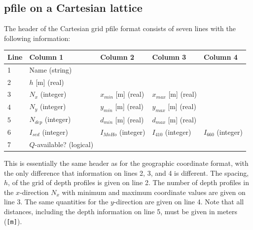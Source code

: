 \documentclass[11pt]{report}
\begin{document}
\subsection{pfile on a Cartesian lattice}
The header of the Cartesian grid pfile format consists of seven lines with the following information:
\begin{center}
\begin{tabular}{lllll}\hline
Line & Column 1& Column 2& Column 3& Column 4\\ \hline
1 & Name (string) & & & \\ \hline
2 & $h$ [m] (real) & & & \\ \hline
3 & $N_{x}$ (integer) & $x_{min}$ [m] (real) & $x_{max}$ [m] (real) & \\ \hline
4 & $N_{y}$ (integer) & $y_{min}$ [m] (real) & $y_{max}$ [m] (real) & \\ \hline
5 & $N_{dep}$ (integer) & $d_{min}$ [m] (real) & $d_{max}$ [m] (real) & \\ \hline
6 & $I_{sed}$ (integer) & $I_{MoHo}$ (integer) & $I_{410}$ (integer) & $I_{660}$ (integer) \\ \hline
7 & $Q$-available? (logical) \\ \hline
\end{tabular}
\end{center}
This is essentially the same header as for the geographic coordinate format, with the only
difference that information on lines 2, 3, and 4 is different. The spacing, $h$, of the grid of
depth profiles is given on line 2.  The number of depth profiles in the $x$-direction $N_x$ with
minimum and maximum coordinate values are given on line 3. The same quantities for the $y$-direction
are given on line 4. Note that all distances, including the depth information on line 5, must be
given in meters ({\tt [m]}).
\end{document}
